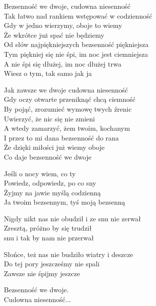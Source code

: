 \begin{text}
    Bezsenność we dwoje, cudowna niesenność\\
    Tak łatwo nad rankiem wstępować w codzienność\\
    Gdy w jedno wierzymy, oboje to wiemy\\
    Że wkrótce już spać nie będziemy\\
    Od słów najpiękniejszych bezsenność piękniejsza\\
    Tym piękniej się nie śpi, im noc jest ciemniejsza\\
    A nie śpi się dłużej, im noc dłużej trwa\\
    Wiesz o tym, tak samo jak ja

    Jak zawsze we dwoje cudowna niesenność\\
    Gdy oczy otwarte przeniknąć chcą ciemność\\
    By pojąć, zrozumieć wymowę twych źrenic\\
    Uwierzyć, że nic się nie zmieni\\
    A wtedy zamarzyć, żem twoim, kochanym\\
    I przez to mi dana bezsenność do rana\\
    Że dzięki miłości już wiemy oboje\\
    Co daje bezsenność we dwoje

    Jeśli o nocy wiem, co ty\\
    Powiedz, odpowiedz, po co sny\\
    Żyjmy na jawie myślą codzienną\\
    Ja twoim bezsennym, tyś moją bezsenną

    Nigdy nikt nas nie obudził i ze snu nie zerwał\\
    Zresztą, próżno by się trudził\\
    snu i tak by nam nie przerwał

    Słońce, też nas nie budziło wiatry i deszcze\\
    Do tej pory jeszcześmy nie spali\\
    Zawsze nie śpijmy jeszcze

    Bezsenność we dwoje.\\
    Cudowna niesenność...
\end{text}
\begin{chord}

\end{chord}